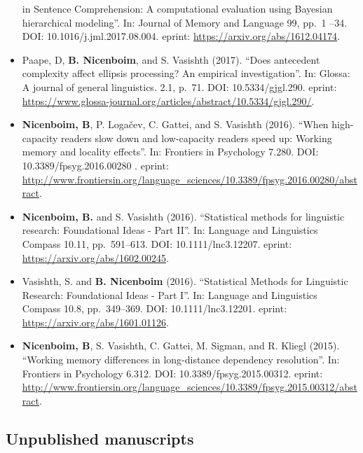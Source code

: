 \documentclass[]{article}
\begin{document}
\begin{itemize}
  in Sentence Comprehension: A computational evaluation using Bayesian
  hierarchical modeling''. In: Journal of Memory and Language 99, pp.~1
  --34. DOI: 10.1016/j.jml.2017.08.004. eprint:
  \url{https://arxiv.org/abs/1612.04174}.
\item
  Paape, D, \textbf{B. Nicenboim}, and S. Vasishth (2017). ``Does
  antecedent complexity affect ellipsis processing? An empirical
  investigation''. In: Glossa: A journal of general linguistics. 2.1,
  p.~71. DOI: 10.5334/gjgl.290. eprint:
  \url{https://www.glossa-journal.org/articles/abstract/10.5334/gjgl.290/}.
\item
  \textbf{Nicenboim, B}, P. Logačev, C. Gattei, and S. Vasishth (2016).
  ``When high-capacity readers slow down and low-capacity readers speed
  up: Working memory and locality effects''. In: Frontiers in Psychology
  7.280. DOI: 10.3389/fpsyg.2016.00280 . eprint:
  \url{http://www.frontiersin.org/language_sciences/10.3389/fpsyg.2016.00280/abstract}.
\item
  \textbf{Nicenboim, B.} and S. Vasishth (2016). ``Statistical methods
  for linguistic research: Foundational Ideas - Part II''. In: Language
  and Linguistics Compass 10.11, pp.~591--613. DOI: 10.1111/lnc3.12207.
  eprint: \url{https://arxiv.org/abs/1602.00245}.
\item
  Vasishth, S. and \textbf{B. Nicenboim} (2016). ``Statistical Methods
  for Linguistic Research: Foundational Ideas - Part I''. In: Language
  and Linguistics Compass 10.8, pp.~349--369. DOI: 10.1111/lnc3.12201.
  eprint: \url{https://arxiv.org/abs/1601.01126}.
\item
  \textbf{Nicenboim, B}, S. Vasishth, C. Gattei, M. Sigman, and R.
  Kliegl (2015). ``Working memory differences in long-distance
  dependency resolution''. In: Frontiers in Psychology 6.312. DOI:
  10.3389/fpsyg.2015.00312. eprint:
  \url{http://www.frontiersin.org/language_sciences/10.3389/fpsyg.2015.00312/abstract}.

   
\end{itemize}

\hypertarget{unpublished-manuscripts}{%
\subsection{Unpublished manuscripts}\label{unpublished-manuscripts}}
\end{document}
